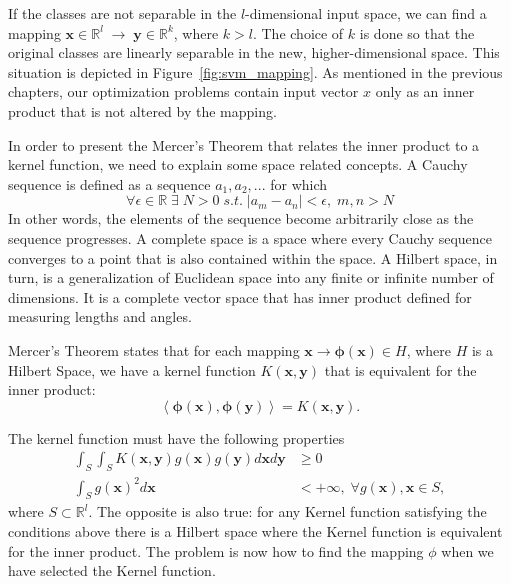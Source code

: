 If the classes are not separable in the $l$-dimensional input space, we can find a mapping $\mathbf{x} \in \mathbb{R}^l \; \rightarrow \; \mathbf{y} \in \mathbb{R}^k$, where $k > l$. The choice of $k$ is done so that the original classes are linearly separable in the new, higher-dimensional space. This situation is depicted in Figure~\ref{fig:svm_mapping}. As mentioned in the previous chapters, our optimization problems contain input vector $x$ only as an inner product that is not altered by the mapping.

In order to present the Mercer's Theorem \cite{Jordan04} that relates the inner product to a kernel function, we need to explain some space related concepts. A Cauchy sequence is defined as a sequence $a_1, a_2, ...$ for which
\begin{equation}
\forall \epsilon \in \mathbb{R} \; \exists \; N > 0  \; s.t.  \; |a_m - a_n| < \epsilon, \; m, n > N
\end{equation}
In other words, the elements of the sequence become arbitrarily close as the sequence progresses. A complete space is a space where every Cauchy sequence converges to a point that is also contained within the space. A Hilbert space, in turn, is a generalization of Euclidean space into any finite or infinite number of dimensions. It is a complete vector space that has inner product defined for measuring lengths and angles. \cite{duchateau02}

Mercer's Theorem states that for each mapping $\mathbf{x} \rightarrow \mathbf{\phi}(\mathbf{x}) \in H$, where $H$ is a Hilbert Space, we have a kernel function $K(\mathbf{x}, \mathbf{y})$ that is equivalent for the inner product:
\begin{equation}
\left \langle \mathbf{\phi}(\mathbf{x}), \mathbf{\phi}(\mathbf{y}) \right \rangle = K(\mathbf{x}, \mathbf{y}).
\end{equation}

The kernel function must have the following properties
\begin{align}
\int_S \int_S K(\mathbf{x}, \mathbf{y})g(\mathbf{x})g(\mathbf{y})d\mathbf{x}d\mathbf{y} &\ge 0 \\ 
\int_S g(\mathbf{x})^2 d\mathbf{x} &< +\infty, \; \forall g(\mathbf{x}), \mathbf{x} \in S, 
\end{align}
where $S \subset \mathbb{R}^l$. The opposite is also true: for any Kernel function satisfying the conditions above there is a Hilbert space where the Kernel function is equivalent for the inner product. The problem is now how to find the mapping $\phi$ when we have selected the Kernel function.

